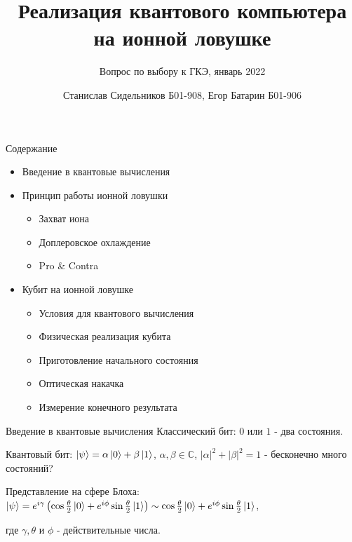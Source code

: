 \documentclass{beamer}
\title{Реализация квантового компьютера на ионной ловушке}
\subtitle{Вопрос по выбору к ГКЭ, январь 2022}
\author{Станислав Сидельников Б01-908, Егор Батарин Б01-906}
\institute{Московский физико-технический институт}
\date{}
\begin{document}
    
    \begin{frame}
        \titlepage
    \end{frame}

    \begin{frame}{Содержание}

        \begin{itemize}

            \item<1-> Введение в квантовые вычисления

      

            \item<2-> Принцип работы ионной ловушки

                \begin{itemize}
                    \item{Захват иона}
                    \item{Доплеровское охлаждение}
                    \item{Pro \& Contra}
                \end{itemize}

            \item<3-> Кубит на ионной ловушке

                \begin{itemize}
                    \item{Условия для квантового вычисления}
                    \item{Физическая реализация кубита}
                    \item{Приготовление начального состояния}
                    \item{Оптическая накачка}
                    \item{Измерение конечного результата}

				\end{itemize}
            
            \end{itemize}

                
        \end{frame}

	\begin{frame}{Введение в квантовые вычисления}
	Классический бит: $0$ или $1$ - два состояния.
	\vspace{3mm}
	
	Квантовый бит: $\ket{\psi} = \alpha\ket{0} + \beta\ket{1}$, $\alpha,\beta \in \mathbb{C}$, $|\alpha|^2 + |\beta|^2 = 1$ - бесконечно много состояний?
	\vspace{3mm}
	
	Представление на сфере Блоха: $\ket{\psi} = e^{i\gamma}\left(  \cos{\frac{\theta}{2}}\ket{0}+e^{i\phi}\sin{\frac{\theta}{2}} \ket{1}  \right) \sim \cos{\frac{\theta}{2}}\ket{0}+e^{i\phi}\sin{\frac{\theta}{2}} \ket{1} $,
	
	где $\gamma, \theta$ и $\phi$ - действительные числа.
	\end{frame}
    
\end{document}
